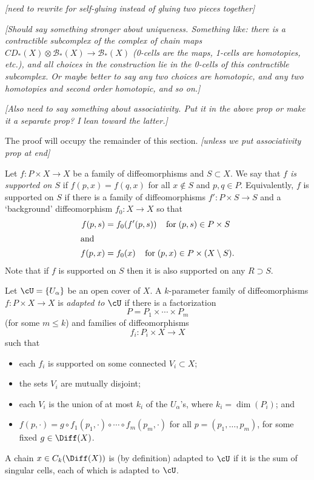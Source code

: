 \documentclass[11pt,leqno]{amsart}
\def\bc{{\mathcal B}}
\def\sub{\subset}
\def\sup{\supset}
\def\setmin{\setminus}
\def\nn#1{{{\it \small [#1]}}}
\newcommand{\eq}[1]{\begin{displaymath}#1\end{displaymath}}
\begin{document}
\nn{need to rewrite for self-gluing instead of gluing two pieces together}

\nn{Should say something stronger about uniqueness.
Something like: there is
a contractible subcomplex of the complex of chain maps
$CD_*(X) \otimes \bc_*(X) \to \bc_*(X)$ (0-cells are the maps, 1-cells are homotopies, etc.),
and all choices in the construction lie in the 0-cells of this
contractible subcomplex.
Or maybe better to say any two choices are homotopic, and
any two homotopies and second order homotopic, and so on.}

\nn{Also need to say something about associativity.
Put it in the above prop or make it a separate prop?
I lean toward the latter.}
\medskip

The proof will occupy the remainder of this section.
\nn{unless we put associativity prop at end}

\medskip

Let $f: P \times X \to X$ be a family of diffeomorphisms and $S \sub X$.
We say that {\it $f$ is supported on $S$} if $f(p, x) = f(q, x)$ for all
$x \notin S$ and $p, q \in P$. Equivalently, $f$ is supported on $S$ if there is a family of diffeomorphisms $f' : P \times S \to S$ and a `background'
diffeomorphism $f_0 : X \to X$ so that
\begin{align}
	f(p,s) & = f_0(f'(p,s)) \;\;\;\; \mbox{for}\; (p, s) \in P\times S \\
\intertext{and}
	f(p,x) & = f_0(x) \;\;\;\; \mbox{for}\; (p, x) \in {P \times (X \setmin S)}.
\end{align}
Note that if $f$ is supported on $S$ then it is also supported on any $R \sup S$.

Let $\cU = \{U_\alpha\}$ be an open cover of $X$.
A $k$-parameter family of diffeomorphisms $f: P \times X \to X$ is
{\it adapted to $\cU$} if there is a factorization
\eq{
    P = P_1 \times \cdots \times P_m
}
(for some $m \le k$)
and families of diffeomorphisms
\eq{
    f_i :  P_i \times X \to X
}
such that
\begin{itemize}
\item each $f_i$ is supported on some connected $V_i \sub X$;
\item the sets $V_i$ are mutually disjoint;
\item each $V_i$ is the union of at most $k_i$ of the $U_\alpha$'s,
where $k_i = \dim(P_i)$; and
\item $f(p, \cdot) = g \circ f_1(p_1, \cdot) \circ \cdots \circ f_m(p_m, \cdot)$
for all $p = (p_1, \ldots, p_m)$, for some fixed $g \in \Diff(X)$.
\end{itemize}
A chain $x \in C_k(\Diff(X))$ is (by definition) adapted to $\cU$ if it is the sum
of singular cells, each of which is adapted to $\cU$.
\end{document}
